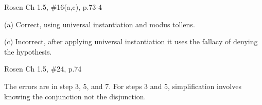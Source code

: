 \documentclass[12pt]{exam}
\newenvironment{my_item}{
\begin{itemize}
    \setlength{\itemsep}{1pt}
    \setlength{\parskip}{0pt}
    \setlength{\parsep}{0pt}
}{\end{itemize}}
\begin{document}
\begin{questions}
\question[4] Rosen Ch 1.5, \#16(a,c), p.73-4
    \begin{solution}
    \begin{my_item}
        \item[(a)] Correct, using universal instantiation and modus tollens.
        \item[(c)] Incorrect, after applying universal instantiation it uses the fallacy of denying the hypothesis.
    \end{my_item}
    \end{solution}

\question[6] Rosen Ch 1.5, \#24, p.74
    \begin{solution}
    The errors are in step 3, 5, and 7.  For steps 3 and 5, simplification
    involves knowing the conjunction not the disjunction.
    \end{solution}


\end{questions}
\end{document}

